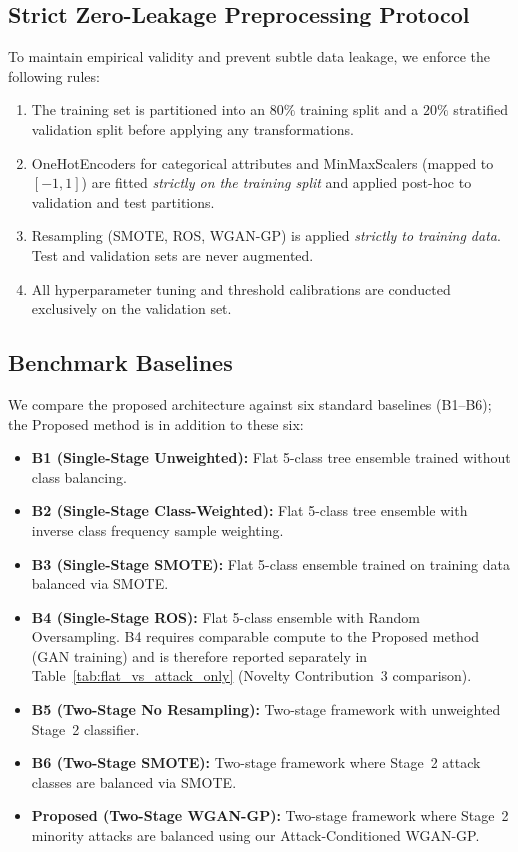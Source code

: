 \documentclass[journal]{IEEEtran}
\begin{document}
\subsection{Strict Zero-Leakage Preprocessing Protocol}
To maintain empirical validity and prevent subtle data leakage, we enforce the following rules:
\begin{enumerate}
    \item The training set is partitioned into an $80\%$ training split and a $20\%$ stratified validation split before applying any transformations.
    \item OneHotEncoders for categorical attributes and MinMaxScalers (mapped to $[-1, 1]$) are fitted \textit{strictly on the training split} and applied post-hoc to validation and test partitions.
    \item Resampling (SMOTE, ROS, WGAN-GP) is applied \textit{strictly to training data}. Test and validation sets are never augmented.
    \item All hyperparameter tuning and threshold calibrations are conducted exclusively on the validation set.
\end{enumerate}

\subsection{Benchmark Baselines}
We compare the proposed architecture against six standard baselines (B1--B6); the Proposed method is in addition to these six:
\begin{itemize}
    \item \textbf{B1 (Single-Stage Unweighted):} Flat 5-class tree ensemble trained without class balancing.
    \item \textbf{B2 (Single-Stage Class-Weighted):} Flat 5-class tree ensemble with inverse class frequency sample weighting.
    \item \textbf{B3 (Single-Stage SMOTE):} Flat 5-class ensemble trained on training data balanced via SMOTE.
    \item \textbf{B4 (Single-Stage ROS):} Flat 5-class ensemble with Random Oversampling. B4 requires comparable compute to the Proposed method (GAN training) and is therefore reported separately in Table~\ref{tab:flat_vs_attack_only} (Novelty Contribution~3 comparison).
    \item \textbf{B5 (Two-Stage No Resampling):} Two-stage framework with unweighted Stage~2 classifier.
    \item \textbf{B6 (Two-Stage SMOTE):} Two-stage framework where Stage~2 attack classes are balanced via SMOTE.
    \item \textbf{Proposed (Two-Stage WGAN-GP):} Two-stage framework where Stage~2 minority attacks are balanced using our Attack-Conditioned WGAN-GP.
\end{itemize}
\end{document}
